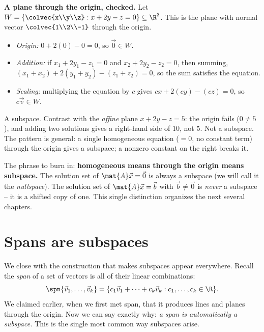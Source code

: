 \begin{example}\label{ch11:plane-subspace}
\textbf{A plane through the origin, checked.} Let
$W = \left\{ \colvec{x\\y\\z} : x + 2y - z = 0 \right\}\subseteq\R^3$. This is the plane
with normal vector $\colvec{1\\2\\-1}$ through the origin.
\begin{itemize}
  \item \emph{Origin:} $0 + 2(0) - 0 = 0$, so $\vec{0}\in W$.
  \item \emph{Addition:} if $x_1+2y_1-z_1=0$ and $x_2+2y_2-z_2=0$, then summing,
  $(x_1+x_2)+2(y_1+y_2)-(z_1+z_2)=0$, so the sum satisfies the equation.
  \item \emph{Scaling:} multiplying the equation by $c$ gives $cx+2(cy)-(cz)=0$, so
  $c\vec{v}\in W$.
\end{itemize}
A subspace. Contrast with the \emph{affine} plane $x+2y-z = 5$: the origin fails
($0\ne 5$), and adding two solutions gives a right-hand side of $10$, not $5$. Not a
subspace. The pattern is general: a single homogeneous equation
($=0$, no constant term) through the origin gives a subspace; a nonzero constant on the
right breaks it.
\end{example}

\begin{focusbox}
The phrase to burn in: \textbf{homogeneous means through the origin means subspace.} The
solution set of $\mat{A}\vec{x}=\vec{0}$ is always a subspace (we will call it the
\emph{nullspace}). The solution set of $\mat{A}\vec{x}=\vec{b}$ with $\vec{b}\ne\vec{0}$ is
\emph{never} a subspace -- it is a shifted copy of one. This single distinction organizes
the next several chapters.
\end{focusbox}

\section{Spans are subspaces}

We close with the construction that makes subspaces appear everywhere. Recall the
\emph{span} of a set of vectors is all of their linear combinations:
\[
\spn\{\vec{v}_1,\dots,\vec{v}_k\} = \{ c_1\vec{v}_1 + \cdots + c_k\vec{v}_k : c_1,\dots,c_k\in\R \}.
\]
We claimed earlier, when we first met span, that it produces lines and planes through the
origin. Now we can say exactly why: \emph{a span is automatically a subspace.} This is the
single most common way subspaces arise.

